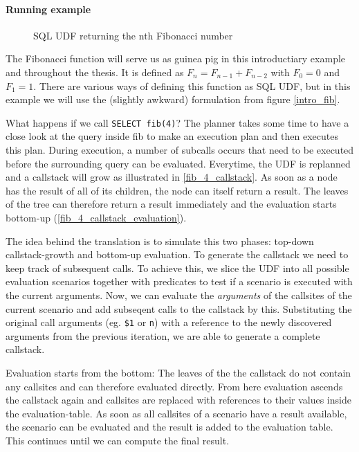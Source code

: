 \paragraph*{Running example}

\begin{wrapfigure}{r}{0.5\textwidth}
  \vspace{-20pt}
  \caption{SQL UDF returning the nth Fibonacci number}
  \label{intro_fib}
\end{wrapfigure}


The Fibonacci function will serve us as guinea pig in this introductiary example and throughout the thesis.
It is defined as $F_n = F_{n-1} + F_{n-2}$ with $F_0 = 0$ and $F_1 = 1$. There are various ways of defining this
function as SQL UDF, but in this example we will use the (slightly awkward) formulation from figure \autoref{intro_fib}.

What happens if we call \texttt{SELECT fib(4)}? The planner takes some time to have a close look at the query inside fib to make an execution plan and then executes this plan. During execution, a number of subcalls occurs that need to be executed before the surrounding query can be evaluated. Everytime, the UDF is replanned and a callstack will grow as illustrated in \autoref{fib_4_callstack}. As soon as a node has the result of all of its children, the node can itself return a result. The leaves of the tree can therefore return a result immediately and the evaluation starts bottom-up (\autoref{fib_4_callstack_evaluation}). 

The idea behind the translation is to simulate this two phases: top-down callstack-growth and bottom-up evaluation. To generate the callstack we need to keep track of subsequent calls. To achieve this, we slice the UDF into all possible evaluation scenarios together with predicates to test if a scenario is executed with the current arguments. Now, we can evaluate the \textit{arguments} of the callsites of the current scenario and add subseqent calls to the callstack by this. Substituting the original call arguments (eg. \texttt{\$1} or \texttt{n}) with a reference to the newly discovered arguments from the previous iteration, we are able to generate a complete callstack.

Evaluation starts from the bottom: The leaves of the the callstack do not contain any callsites and can therefore evaluated directly. From here evaluation ascends the callstack again and callsites are replaced with references to their values inside the evaluation-table. As soon as all callsites of a scenario have a result available, the scenario can be evaluated and the result is added to the evaluation table. This continues until we can compute the final result.

